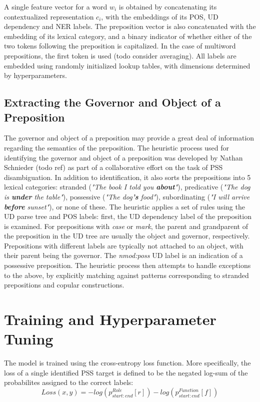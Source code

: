 A single feature vector for a word $w_i$ is obtained by concatenating its contextualized representation $c_i$, with the embeddings of its POS, UD dependency and NER labels. The preposition vector is also concatenated with the embedding of its lexical category, and a binary indicator of whether either of the two tokens following the preposition is capitalized. In the case of multiword prepositions, the first token is used (todo consider averaging). All labels are embedded using randomly initialized lookup tables, with dimensions determined by hyperparameters.

\subsection{Extracting the Governor and Object of a Preposition} \label{sec:govobj}

The governor and object of a preposition may provide a great deal of information regarding the semantics of the preposition. The heuristic process used for identifying the governor and object of a preposition was developed by Nathan Schnieder (todo ref) as part of a collaborative effort on the task of PSS disambiguation. In addition to identification, it also sorts the prepositions into 5 lexical categories: stranded (\emph{"The book I told you \textbf{about}"}), predicative (\emph{"The dog is \textbf{under} the table"}), possessive (\emph{"The dog\textbf{'s} food"}), subordinating (\emph{"I will arrive \textbf{before} sunset"}), or none of these. The heuristic applies a set of rules using the UD parse tree and POS labels: first, the UD dependency label of the preposition is examined. For prepositions with \emph{case} or \emph{mark}, the parent and grandparent of the preposition in the UD tree are usually the object and governor, respectively. Prepositions with different labels are typically not attached to an object, with their parent being the governor.  The \emph{nmod:poss} UD label is an indication of a possessive preposition. The heuristic process then attempts to handle exceptions to the above, by explicitly matching against patterns corresponding to stranded prepositions and copular constructions.  
\section{Training and Hyperparameter Tuning} \label{sec:psstraining}

The model is trained using the cross-entropy loss function. More specifically, the loss of a single identified PSS target is defined to be the negated log-sum of the probabilites assigned to the correct labels: 
$$ Loss(x, y) = - log(p^{Role}_{start:end}[r]) - log(p^{Function}_{start:end}[f]) $$


